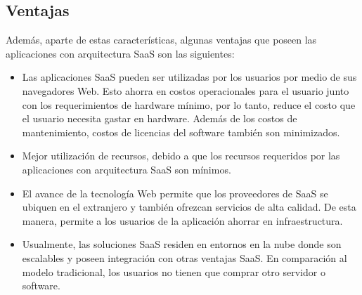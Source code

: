 \subsection{Ventajas}
Además, aparte de estas características, algunas ventajas que poseen las aplicaciones con arquitectura SaaS son las siguientes: \citep{li2012cooperative}\citep{ma2007business}\citep{chou2008software} 
\begin{itemize}
	\item Las aplicaciones SaaS pueden ser utilizadas por los usuarios por medio de sus navegadores Web. Esto ahorra en costos operacionales para el usuario junto con los requerimientos de hardware mínimo, por lo tanto, reduce el costo que el usuario necesita gastar en hardware.  Además de los costos de mantenimiento, costos de licencias del software también son minimizados.
	\item Mejor utilización de recursos, debido a que los recursos requeridos por las aplicaciones con arquitectura SaaS son mínimos.
	\item El avance de la tecnología Web permite que los proveedores de SaaS se ubiquen en el extranjero y también ofrezcan servicios de alta calidad. De esta manera, permite a los usuarios de la aplicación ahorrar en infraestructura.
	\item Usualmente, las soluciones SaaS residen en entornos en la nube donde son escalables y poseen integración con otras ventajas SaaS. En comparación al modelo tradicional, los usuarios no tienen que comprar otro servidor o software.
\end{itemize}
